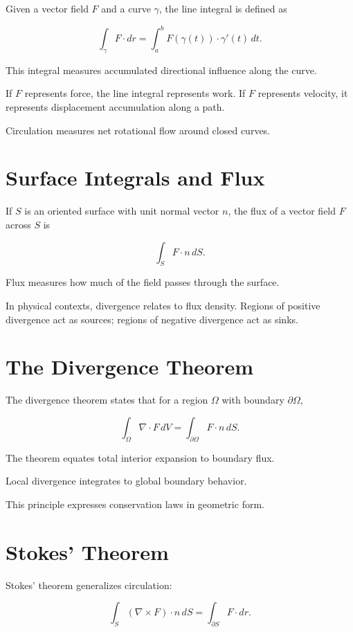 \documentclass[12pt]{book}
\begin{document}
Given a vector field $F$ and a curve $\gamma$, the line integral is defined as

\[
\int_\gamma F \cdot dr
=
\int_a^b F(\gamma(t)) \cdot \gamma'(t)\, dt.
\]

This integral measures accumulated directional influence along the curve.

If $F$ represents force, the line integral represents work. If $F$ represents velocity, it represents displacement accumulation along a path.

Circulation measures net rotational flow around closed curves.

\section{Surface Integrals and Flux}

If $S$ is an oriented surface with unit normal vector $n$, the flux of a vector field $F$ across $S$ is

\[
\int_S F \cdot n\, dS.
\]

Flux measures how much of the field passes through the surface.

In physical contexts, divergence relates to flux density. Regions of positive divergence act as sources; regions of negative divergence act as sinks.

\section{The Divergence Theorem}

The divergence theorem states that for a region $\Omega$ with boundary $\partial \Omega$,

\[
\int_\Omega \nabla \cdot F\, dV
=
\int_{\partial \Omega} F \cdot n\, dS.
\]

The theorem equates total interior expansion to boundary flux.

Local divergence integrates to global boundary behavior.

This principle expresses conservation laws in geometric form.

\section{Stokes' Theorem}

Stokes' theorem generalizes circulation:

\[
\int_S (\nabla \times F) \cdot n\, dS
=
\int_{\partial S} F \cdot dr.
\]
\end{document}
